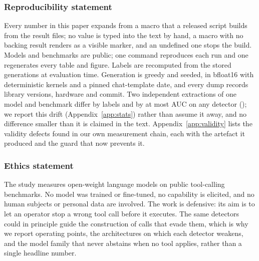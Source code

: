 \documentclass{article}
\theoremstyle{definition}
\begin{document}
\subsubsection*{Reproducibility statement}
Every number in this paper expands from a macro that a released script builds from the result files; no
value is typed into the text by hand, a macro with no backing result renders as a visible marker, and an
undefined one stops the build. Models and benchmarks are public; one command reproduces each run and one
regenerates every table and figure. Labels are recomputed from the stored generations at evaluation time.
Generation is greedy and seeded, in bfloat16 with deterministic kernels and a pinned chat-template date, and
every dump records library versions, hardware and commit. Two independent extractions of one model and
benchmark differ by \replItemsDeltaBaseLlamaOneBGlaive{} labels and by at most
\replMaxAucDeltaBaseLlamaOneBGlaive{} AUC on any detector (\replMaxAucDetectorBaseLlamaOneBGlaive{}); we
report this drift (Appendix~\ref{app:stats}) rather than assume it away, and no difference smaller than it is
claimed in the text. Appendix~\ref{app:validity} lists the validity defects found in our own measurement
chain, each with the artefact it produced and the guard that now prevents it.

\subsubsection*{Ethics statement}
The study measures open-weight language models on public tool-calling benchmarks. No model was trained or
fine-tuned, no capability is elicited, and no human subjects or personal data are involved. The work is
defensive: its aim is to let an operator stop a wrong tool call before it executes. The same detectors could
in principle guide the construction of calls that evade them, which is why we report operating points, the
architectures on which each detector weakens, and the model family that never abstains when no tool applies,
rather than a single headline number.





\end{document}
